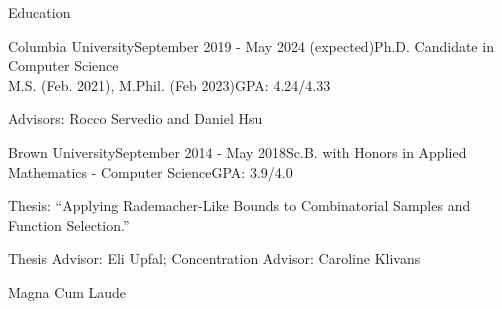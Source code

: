 \documentclass{resume} %
\begin{document}

\begin{rSection}{Education}

\begin{rSubsection}{Columbia University}{September 2019 - May 2024 (expected)}{Ph.D. Candidate in Computer Science \\ M.S. (Feb. 2021), M.Phil. (Feb 2023)}{GPA: 4.24/4.33}
\item Advisors: Rocco Servedio and Daniel Hsu
\end{rSubsection}

\begin{rSubsection}{Brown University}{September 2014 - May 2018}{Sc.B. with Honors in Applied Mathematics - Computer Science}{GPA: 3.9/4.0}
\item Thesis: ``Applying Rademacher-Like Bounds to Combinatorial Samples and Function Selection.''
\item Thesis Advisor: Eli Upfal; Concentration Advisor: Caroline Klivans
\item Magna Cum Laude
\end{rSubsection}

\end{rSection}




\end{document}
